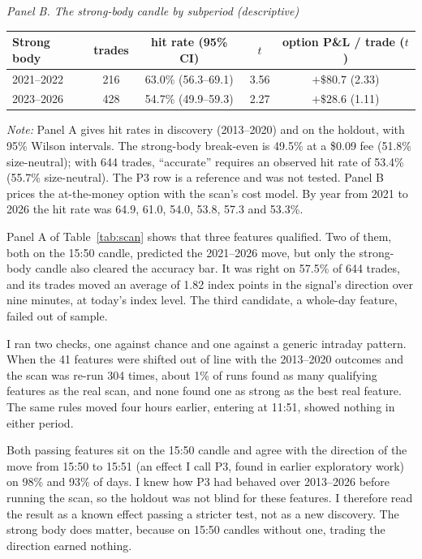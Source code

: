 \documentclass[12pt,letterpaper]{article}
\newcommand{\tabnotes}[1]{\par\vspace{5pt}\parbox{\linewidth}{\footnotesize\setlength{\parindent}{0pt}\textit{Note:} #1}\par}
\newcommand{\dollar}{\$}
\begin{document}
\begin{table}[htbp]
\bigskip
\begin{minipage}{\linewidth}\centering
\textit{Panel B. The strong-body candle by subperiod (descriptive)}\par\smallskip
\begin{tabular}{lcccc}
\toprule
Strong body & trades & hit rate (95\% CI) & $t$ & option P\&L / trade ($t$) \\
\midrule
2021--2022 & 216 & 63.0\% (56.3--69.1) & 3.56 & $+\dollar80.7$ (2.33) \\
2023--2026 & 428 & 54.7\% (49.9--59.3) & 2.27 & $+\dollar28.6$ (1.11) \\
\bottomrule
\end{tabular}
\end{minipage}
\tabnotes{Panel A gives hit rates in discovery (2013--2020) and on the holdout,
with 95\% Wilson intervals. The strong-body break-even is 49.5\% at a \$0.09 fee
(51.8\% size-neutral); with 644 trades, ``accurate'' requires an observed hit
rate of 53.4\% (55.7\% size-neutral). The P3 row is a reference and was not
tested. Panel B prices the at-the-money option with the scan's cost model. By
year from 2021 to 2026 the hit rate was 64.9, 61.0, 54.0, 53.8, 57.3 and
53.3\%.}
\end{table}

Panel A of Table~\ref{tab:scan} shows that three features qualified. Two of them,
both on the 15:50 candle, predicted the 2021--2026 move, but only the strong-body
candle also cleared the accuracy bar. It was right on 57.5\% of 644 trades, and
its trades moved an average of 1.82 index points in the signal's direction over
nine minutes, at today's index level. The third candidate, a whole-day feature,
failed out of sample.

I ran two checks, one against chance and one against a generic intraday
pattern. When the
41 features were shifted out of line with the 2013--2020 outcomes and the scan
was re-run 304 times, about 1\% of runs found as many qualifying features as the
real scan, and none found one as strong as the best real feature. The same rules
moved four hours earlier, entering at 11:51, showed nothing in either period.

Both passing
features sit on the 15:50 candle and agree with the direction of the move from
15:50 to 15:51 (an effect I call P3, found in earlier exploratory work) on 98\% and 93\% of
days. I knew how P3 had behaved over 2013--2026 before running the scan, so the
holdout was not blind for these features. I therefore read the result as a
known effect passing a stricter test, not as a new discovery. The strong body
does matter, because on 15:50 candles without one, trading the direction earned
nothing.
\end{document}
